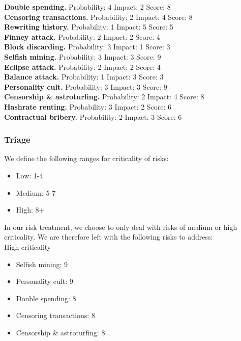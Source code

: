 \documentclass[12pt,a4paper]{article}
\begin{document}
\textbf{Double spending.}
Probability: 4
Impact: 2
Score: 8\\

\textbf{Censoring transactions.}
Probability: 2
Impact: 4
Score: 8\\

\textbf{Rewriting history.}
Probability: 1
Impact: 5
Score: 5\\

\textbf{Finney attack.}
Probability: 2
Impact: 2
Score: 4\\

\textbf{Block discarding.}
Probability: 3
Impact: 1
Score: 3\\

\textbf{Selfish mining.}
Probability: 3
Impact: 3
Score: 9\\

\textbf{Eclipse attack.}
Probability: 2
Impact: 2
Score: 4\\

\textbf{Balance attack.}
Probability: 1
Impact: 3
Score: 3\\

\textbf{Personality cult.}
Probability: 3
Impact: 3
Score: 9\\

\textbf{Censorship \& astroturfing.}
Probability: 2
Impact: 4
Score: 8\\

\textbf{Hashrate renting.}
Probability: 3
Impact: 2
Score: 6\\

\textbf{Contractual bribery.}
Probability: 2
Impact: 3
Score: 6\\

\subsubsection{Triage}

We define the following ranges for criticality of risks:
\begin{itemize}
  \item Low: 1-4
  \item Medium: 5-7
  \item High: 8+
\end{itemize}

In our risk treatment, we choose to only deal with risks of medium or high criticality. We are therefore left with the following risks to address:\\

High criticality
\begin{itemize}
  \item Selfish mining: 9
  \item Personality cult: 9
  \item Double spending: 8
  \item Censoring transactions: 8
  \item Censorship \& astroturfing: 8
\end{itemize}
\end{document}
